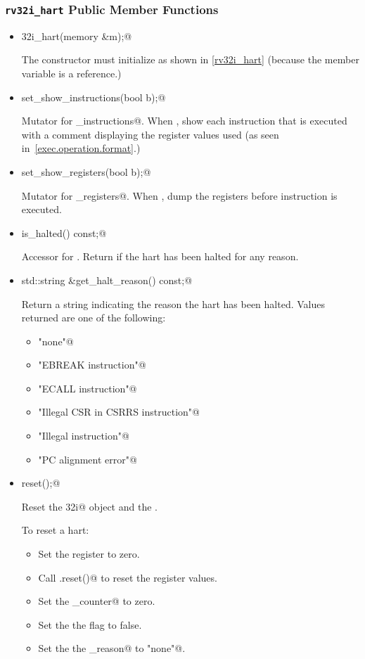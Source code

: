 \documentclass{article}
\begin{document}
\subsubsection{{\tt rv32i\_hart} Public Member Functions}

\begin{itemize}

\item \verb@rv32i_hart(memory &m);@

	The constructor must initialize \verb@mem@ as shown in \autoref{rv32i_hart} 
	(because the \verb@mem@ member variable is a reference.)

\item \verb@void set_show_instructions(bool b);@

	Mutator for \verb@show_instructions@.
	When \verb@true@, show each instruction that is executed with a comment 
	displaying the register values used (as seen in~\autoref{exec.operation.format}.)

\item \verb@void set_show_registers(bool b);@

	Mutator for \verb@show_registers@.
	When \verb@true@, dump the registers before instruction is executed.

\item \verb@bool is_halted() const;@

	Accessor for \verb@halt@.
	Return \verb@true@ if the hart has been halted for any reason.

\item \verb@const std::string &get_halt_reason() const;@

	Return a string indicating the reason the hart has been halted.
	Values returned are one of the following:
\begin{itemize}
\item \verb@"none"@
\item \verb@"EBREAK instruction"@
\item \verb@"ECALL instruction"@
\item \verb@"Illegal CSR in CSRRS instruction"@
\item \verb@"Illegal instruction"@
\item \verb@"PC alignment error"@
\end{itemize}


\item \verb@void reset();@

Reset the \verb@rv32i@ object and the \verb@registerfile@.  

To reset a hart:
\begin{itemize}
\item Set the \verb@pc@ register to zero.
\item Call \verb@regs.reset()@ to reset the register values.
\item Set the \verb@insn_counter@ to zero.
\item Set the the \verb@halt@ flag to false.
\item Set the the \verb@halt_reason@ to \verb@"none"@.
\end{itemize}



\end{itemize}
\end{document}
